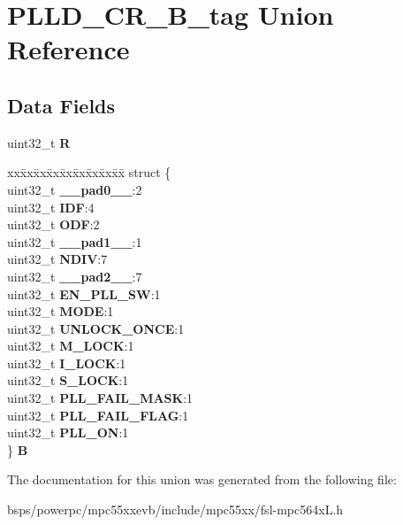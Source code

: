 \hypertarget{unionPLLD__CR__32B__tag}{}\section{P\+L\+L\+D\+\_\+\+C\+R\+\_\+B\+\_\+tag Union Reference}
\label{unionPLLD__CR__32B__tag}
\subsection*{Data Fields}
\begin{DoxyCompactItemize}
\item 
\mbox{\label{unionPLLD__CR__32B__tag_ad0ead9e4b0f9833bfea44a736fc80154}} 
uint32\+\_\+t {\bfseries R}
\item 
\mbox{\label{unionPLLD__CR__32B__tag_a3b677b3fbc8553cde706e18d08066276}} 
\begin{tabbing}
xx\=xx\=xx\=xx\=xx\=xx\=xx\=xx\=xx\=\kill
struct \{\\
\>uint32\_t {\bfseries \_\_pad0\_\_}:2\\
\>uint32\_t {\bfseries IDF}:4\\
\>uint32\_t {\bfseries ODF}:2\\
\>uint32\_t {\bfseries \_\_pad1\_\_}:1\\
\>uint32\_t {\bfseries NDIV}:7\\
\>uint32\_t {\bfseries \_\_pad2\_\_}:7\\
\>uint32\_t {\bfseries EN\_PLL\_SW}:1\\
\>uint32\_t {\bfseries MODE}:1\\
\>uint32\_t {\bfseries UNLOCK\_ONCE}:1\\
\>uint32\_t {\bfseries M\_LOCK}:1\\
\>uint32\_t {\bfseries I\_LOCK}:1\\
\>uint32\_t {\bfseries S\_LOCK}:1\\
\>uint32\_t {\bfseries PLL\_FAIL\_MASK}:1\\
\>uint32\_t {\bfseries PLL\_FAIL\_FLAG}:1\\
\>uint32\_t {\bfseries PLL\_ON}:1\\
\} {\bfseries B}\\

\end{tabbing}\end{DoxyCompactItemize}


The documentation for this union was generated from the following file\+:\begin{DoxyCompactItemize}
\item 
bsps/powerpc/mpc55xxevb/include/mpc55xx/fsl-\/mpc564x\+L.\+h\end{DoxyCompactItemize}
